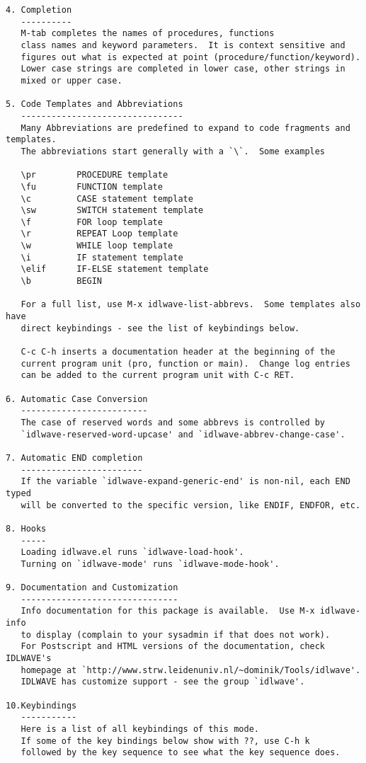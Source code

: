 \begin{verbatim}
4. Completion
   ----------
   M-tab completes the names of procedures, functions
   class names and keyword parameters.  It is context sensitive and
   figures out what is expected at point (procedure/function/keyword).
   Lower case strings are completed in lower case, other strings in
   mixed or upper case.

5. Code Templates and Abbreviations
   --------------------------------
   Many Abbreviations are predefined to expand to code fragments and templates.
   The abbreviations start generally with a `\`.  Some examples

   \pr        PROCEDURE template
   \fu        FUNCTION template
   \c         CASE statement template
   \sw        SWITCH statement template
   \f         FOR loop template
   \r         REPEAT Loop template
   \w         WHILE loop template
   \i         IF statement template
   \elif      IF-ELSE statement template
   \b         BEGIN
   
   For a full list, use M-x idlwave-list-abbrevs.  Some templates also have
   direct keybindings - see the list of keybindings below.

   C-c C-h inserts a documentation header at the beginning of the
   current program unit (pro, function or main).  Change log entries
   can be added to the current program unit with C-c RET.

6. Automatic Case Conversion
   -------------------------
   The case of reserved words and some abbrevs is controlled by
   `idlwave-reserved-word-upcase' and `idlwave-abbrev-change-case'.

7. Automatic END completion
   ------------------------
   If the variable `idlwave-expand-generic-end' is non-nil, each END typed
   will be converted to the specific version, like ENDIF, ENDFOR, etc.

8. Hooks
   -----
   Loading idlwave.el runs `idlwave-load-hook'.
   Turning on `idlwave-mode' runs `idlwave-mode-hook'.

9. Documentation and Customization
   -------------------------------
   Info documentation for this package is available.  Use M-x idlwave-info
   to display (complain to your sysadmin if that does not work).
   For Postscript and HTML versions of the documentation, check IDLWAVE's
   homepage at `http://www.strw.leidenuniv.nl/~dominik/Tools/idlwave'.
   IDLWAVE has customize support - see the group `idlwave'.

10.Keybindings
   -----------
   Here is a list of all keybindings of this mode.
   If some of the key bindings below show with ??, use C-h k
   followed by the key sequence to see what the key sequence does.


\end{verbatim}
